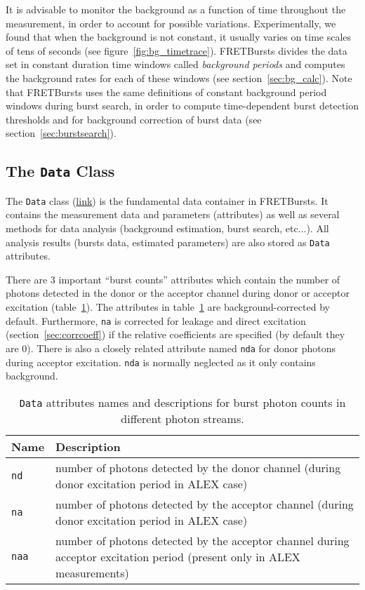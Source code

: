 It is advisable to monitor the background as a function of time
throughout the measurement, in order to account for possible variations.
Experimentally, we found that when the background is not constant,
it usually varies
on time scales of tens of seconds (see figure~\ref{fig:bg_timetrace}).
FRETBursts divides the data set in constant duration time
windows called \textit{background periods} and computes the background rates for
each of these windows (see section~\ref{sec:bg_calc}).
Note that FRETBursts uses the same definitions of constant background period windows during burst search, 
in order to compute time-dependent burst detection thresholds 
and for background correction of burst data (see section~\ref{sec:burstsearch}).

\subsection{The \texttt{Data} Class}
\label{sec:data_intro}

The \verb|Data| class
(\href{http://fretbursts.readthedocs.org/en/latest/data_class.html}{link})
is the fundamental data container in FRETBursts. It contains the
measurement data and parameters (attributes) as well as several methods
for data analysis (background estimation, burst search, etc...).
All analysis results (bursts data, estimated parameters) are also stored
as \verb|Data| attributes.

There are 3 important ``burst counts'' attributes which contain
the number of photons detected in the donor or the acceptor channel
during donor or acceptor excitation (table~\ref{tab:data_n}).
The attributes in table~\ref{tab:data_n} are background-corrected by default.
Furthermore, \verb|na| is corrected for leakage and direct excitation
(section~\ref{sec:corrcoeff}) if the relative coefficients are specified
(by default they are 0).
There is also a closely related attribute named \verb|nda| for donor photons
during acceptor excitation. \verb|nda| is normally neglected as it only contains
background.

\begin{table}
\begin{tabular}{l p{}}
  Name  & Description \\
  \hline
  \verb|nd| & number of photons detected by the donor channel (during donor excitation period in ALEX case)\\
  \verb|na| & number of photons detected by the acceptor channel (during donor excitation period in ALEX case)\\
  \verb|naa| & number of photons detected by the acceptor channel during acceptor excitation period (present only in ALEX measurements)\\
\end{tabular}
\caption{\label{tab:data_n}\texttt{Data} attributes names and descriptions for burst photon counts in different photon streams.}
\end{table}


